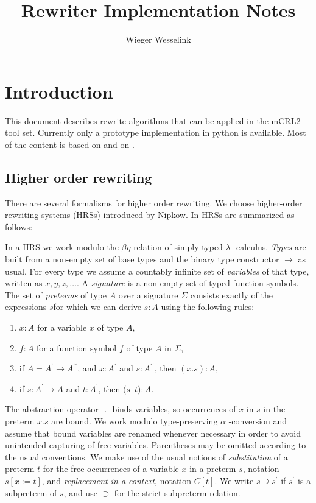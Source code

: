 \documentclass{article}
\begin{document}
\title{Rewriter Implementation Notes}
\author{Wieger Wesselink}
\maketitle

\section{Introduction}

This document describes rewrite algorithms that can be applied in the mCRL2
tool set. Currently only a prototype implementation in python is available.
Most of the content is based on \cite{weerdenburg2009} and on \cite%
{vanderwulp2009}.

\subsection{Higher order rewriting}

There are several formalisms for higher order rewriting. We choose
higher-order rewriting systems (HRSs) introduced by Nipkow. In \cite%
{DBLP:conf/rta/Raamsdonk01} HRSs are summarized as follows:

In a HRS we work modulo the $\beta \eta $-relation of simply typed $\lambda $%
-calculus. \emph{Types} are built from a non-empty set of base types and the
binary type constructor $\rightarrow $ as usual. For every type we assume a
countably infinite set of \emph{variables} of that type, written as $%
x,y,z,\ldots $. A \emph{signature} is a non-empty set of typed function
symbols. The set of \emph{preterms} of type $A$ over a signature $\Sigma $
consists exactly of the expressions $s$for which we can derive $s:A$ using
the following rules:

\begin{enumerate}
\item $x:A$ for a variable $x$ of type $A$,

\item $f:A$ for a function symbol $f$ of type $A$ in $\Sigma $,

\item if $A=A^{\prime }\rightarrow A^{\prime \prime }$, and $x:A^{\prime }$
and $s:A^{\prime \prime }$, then $(x.s):A$,

\item if $s:A^{\prime }\rightarrow A$ and $t:A^{\prime }$, then $(s$\ $t):A$.
\end{enumerate}

The abstraction operator $\_.\_$ binds variables, so occurrences of $x$ in $s
$ in the preterm $x.s$ are bound. We work modulo type-preserving $\alpha $%
-conversion and assume that bound variables are renamed whenever necessary
in order to avoid unintended capturing of free variables. Parentheses may be
omitted according to the usual conventions. We make use of the usual notions
of \emph{substitution} of a preterm $t$ for the free occurrences of a
variable $x$ in a preterm $s$, notation $s[x:=t]$, and \emph{replacement in
a context}, notation $C[t]$. We write $s\supseteq s^{\prime }$ if $s^{\prime
}$ is a subpreterm of $s$, and use $\supset $ for the strict subpreterm
relation.
\end{document}
